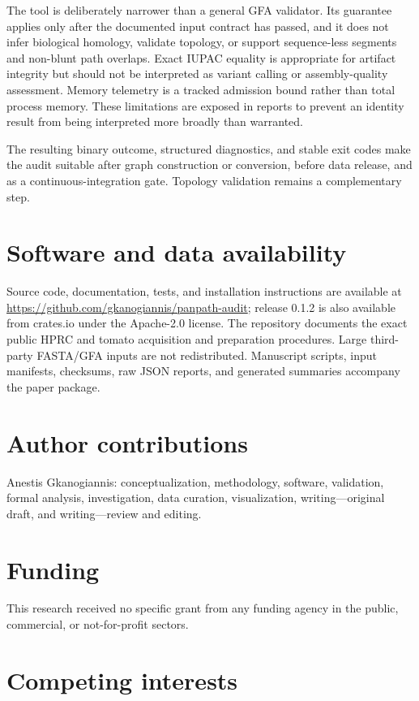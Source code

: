 \documentclass[10pt]{article}
\begin{document}
The tool is deliberately narrower than a general GFA validator. Its guarantee
applies only after the documented input contract has passed, and it does not
infer biological homology, validate topology, or support sequence-less segments
and non-blunt path overlaps. Exact IUPAC equality is appropriate for artifact
integrity but should not be interpreted as variant calling or assembly-quality
assessment. Memory telemetry is a tracked admission bound rather than total
process memory. These limitations are exposed in reports to prevent an identity
result from being interpreted more broadly than warranted.

The resulting binary outcome, structured diagnostics, and stable exit codes
make the audit suitable after graph construction or conversion, before data
release, and as a continuous-integration gate. Topology validation remains a
complementary step.

\section*{Software and data availability}

Source code, documentation, tests, and installation instructions are available
at \url{https://github.com/gkanogiannis/panpath-audit}; release 0.1.2 is also
available from crates.io under the Apache-2.0 license. The repository documents
the exact public HPRC and tomato acquisition and preparation procedures. Large
third-party FASTA/GFA inputs are not redistributed. Manuscript scripts, input
manifests, checksums, raw JSON reports, and generated summaries accompany the
paper package.

\section*{Author contributions}

Anestis Gkanogiannis: conceptualization, methodology, software, validation,
formal analysis, investigation, data curation, visualization, writing---original
draft, and writing---review and editing.

\section*{Funding}

This research received no specific grant from any funding agency in the public,
commercial, or not-for-profit sectors.

\section*{Competing interests}
\end{document}
